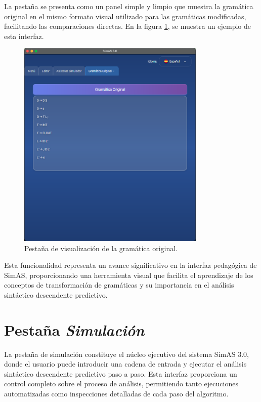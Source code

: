 La pestaña se presenta como un panel simple y limpio que muestra la gramática original en el mismo formato visual utilizado para las gramáticas modificadas, facilitando las comparaciones directas. En la figura \ref{fig:gramatica_original}, se muestra un ejemplo de esta interfaz.

\needspace{8cm}
\begin{figure}[H]
\centering
\includegraphics[width=0.8\textwidth]{figuras2/simulador/gramatica_original.png}
\caption{Pestaña de visualización de la gramática original.}
\label{fig:gramatica_original}
\end{figure}

Esta funcionalidad representa un avance significativo en la interfaz pedagógica de SimAS, proporcionando una herramienta visual que facilita el aprendizaje de los conceptos de transformación de gramáticas y su importancia en el análisis sintáctico descendente predictivo.

\section{Pestaña \textit{Simulación}}

La pestaña de simulación constituye el núcleo ejecutivo del sistema SimAS 3.0, donde el usuario puede introducir una cadena de entrada y ejecutar el análisis sintáctico descendente predictivo paso a paso. Esta interfaz proporciona un control completo sobre el proceso de análisis, permitiendo tanto ejecuciones automatizadas como inspecciones detalladas de cada paso del algoritmo.

